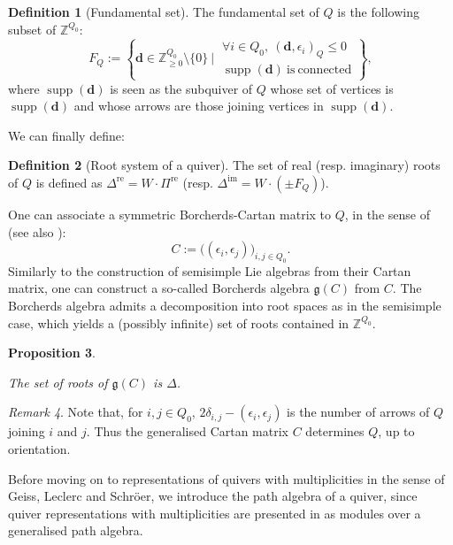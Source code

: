 \documentclass[11pt,english]{article}
\numberwithin{equation}{section}
\numberwithin{figure}{section}
\theoremstyle{definition}
\newtheorem{df}{Definition}[subsection]
\theoremstyle{plain}
\newtheorem{prop}[df]{Proposition}
\theoremstyle{remark}
\newtheorem{rmk}[df]{Remark}
\DeclareMathOperator{\supp}{supp}
\newcommand\dd{\mathbf{d}}
\newcommand\ZZ{\mathbb{Z}}
\begin{document}
\begin{df}[Fundamental set]

The fundamental set of $Q$ is the following subset of $\ZZ^{Q_{0}}$:\[
F_Q:=
\left\{
\dd\in\ZZ_{\geq0}^{Q_0}\setminus\{0\}\ \vert\ 
\substack{
\forall i\in Q_0,\ (\dd,\epsilon_i)_Q\leq0 \\
\supp(\dd)\ \mathrm{is}\ \mathrm{connected}
}
\right\},
\] where $\supp(\dd)$ is seen as the subquiver of $Q$ whose set of
vertices is $\supp(\dd)$ and whose arrows are those joining vertices
in $\supp(\dd)$.

\end{df}

We can finally define:

\begin{df}[Root system of a quiver]

The set of real (resp. imaginary) roots of $Q$ is defined as $\Delta^{\mathrm{re}}=W\cdot\Pi^{\mathrm{re}}$
(resp. $\Delta^{\mathrm{im}}=W\cdot(\pm F_{Q})$).

\end{df}

One can associate a symmetric Borcherds-Cartan matrix to $Q$, in
the sense of \cite{Bor88} (see also \cite[\S 11.13]{Kac95}):\[
C:=\Big( (\epsilon_i,\epsilon_j)\Big)_{i,j\in Q_0}.
\]Similarly to the construction of semisimple Lie algebras from their
Cartan matrix, one can construct a so-called Borcherds algebra $\mathfrak{g}(C)$
from $C$. The Borcherds algebra admits a decomposition into root
spaces as in the semisimple case, which yields a (possibly infinite)
set of roots contained in $\ZZ^{Q_{0}}$.

\begin{prop}{\cite[\S 11.13]{Kac95}}

The set of roots of $\mathfrak{g}(C)$ is $\Delta$.

\end{prop}

\begin{rmk}

Note that, for $i,j\in Q_{0}$, $2\delta_{i,j}-(\epsilon_{i},\epsilon_{j})$
is the number of arrows of $Q$ joining $i$ and $j$. Thus the generalised
Cartan matrix $C$ determines $Q$, up to orientation.

\end{rmk}

Before moving on to representations of quivers with multiplicities
in the sense of Geiss, Leclerc and Schröer, we introduce the path
algebra of a quiver, since quiver representations with multiplicities
are presented in \cite{GLS17a} as modules over a generalised path
algebra.
\end{document}
